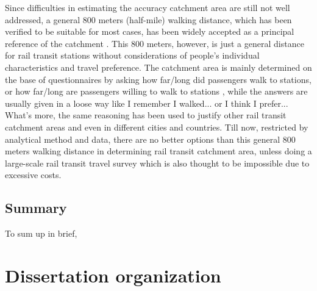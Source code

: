 Since difficulties in estimating the accuracy catchment area are still not well addressed, a general 800 meters (half-mile) walking distance, which has been verified to be suitable for most cases, has been widely accepted as a principal reference of the catchment \cite{kuby2004factors,gutierrez2011transit,cardozo2012application,zhao2013influences}. This 800 meters, however, is just a general distance for rail transit stations without considerations of people's individual characteristics and travel preference. The catchment area is mainly determined on the base of questionnaires by asking how far/long did passengers walk to stations, or how far/long are passengers willing to walk to stations \cite{keijer2000people,zhao2003forecasting,garcia2013walking}, while the answers are usually given in a loose way like I remember I walked... or I think I prefer... What's more, the same reasoning has been used to justify other rail transit catchment areas and even in different cities and countries. Till now, restricted by analytical method and data, there are no better options than this general 800 meters walking distance in determining rail transit catchment area, unless doing a large-scale rail transit travel survey which is also thought to be impossible due to excessive costs.

\subsection{Summary}
To sum up in brief, 


\section{Dissertation organization}

\clearpage %

